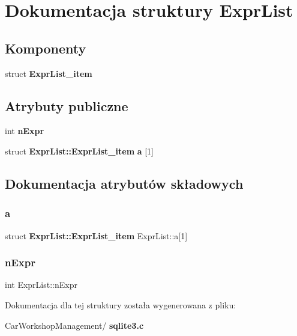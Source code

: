 \section{Dokumentacja struktury Expr\+List}
\label{struct_expr_list}
\subsection*{Komponenty}
\begin{DoxyCompactItemize}
\item 
struct \textbf{ Expr\+List\+\_\+item}
\end{DoxyCompactItemize}
\subsection*{Atrybuty publiczne}
\begin{DoxyCompactItemize}
\item 
int \textbf{ n\+Expr}
\item 
struct \textbf{ Expr\+List\+::\+Expr\+List\+\_\+item} \textbf{ a} [1]
\end{DoxyCompactItemize}


\subsection{Dokumentacja atrybutów składowych}
\mbox{\label{struct_expr_list_acd86bd68fd8f9508bcce9e733a7d523c}} 
\subsubsection{a}
{\footnotesize\ttfamily struct \textbf{ Expr\+List\+::\+Expr\+List\+\_\+item}  Expr\+List\+::a[1]}

\mbox{\label{struct_expr_list_a88bdbd62cce306124eea63ae9f80ec33}} 
\subsubsection{nExpr}
{\footnotesize\ttfamily int Expr\+List\+::n\+Expr}



Dokumentacja dla tej struktury została wygenerowana z pliku\+:\begin{DoxyCompactItemize}
\item 
Car\+Workshop\+Management/\textbf{ sqlite3.\+c}\end{DoxyCompactItemize}
